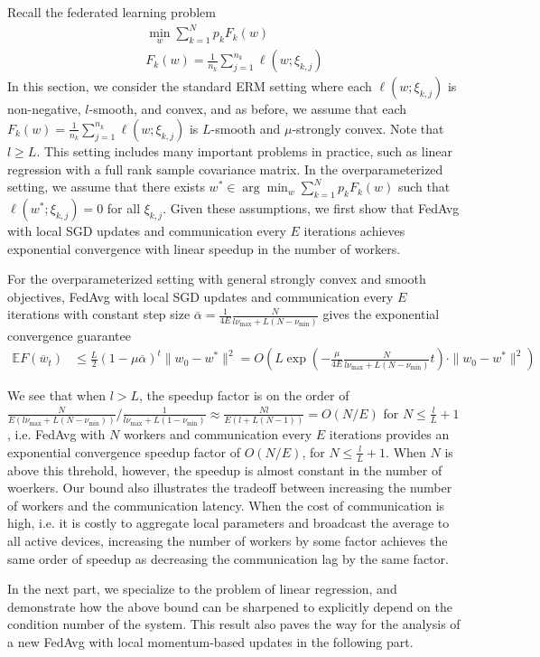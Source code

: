 Recall the federated learning problem 
\begin{align*}
\min_{w}\sum_{k=1}^{N}p_{k}F_{k}(w)\\
F_{k}(w)=\frac{1}{n_{k}}\sum_{j=1}^{n_{k}}\ell(w;\xi_{k,j})
\end{align*}
In this section, we consider the standard ERM setting where each
$\ell(w;\xi_{k,j})$ is non-negative, $l$-smooth, and convex, and
as before, we assume that each $F_{k}(w)=\frac{1}{n_{k}}\sum_{j=1}^{n_{k}}\ell(w;\xi_{k,j})$
is $L$-smooth and $\mu$-strongly convex. Note that $l\geq L$. This
setting includes many important problems in practice, such as linear
regression with a full rank sample covariance matrix. In the overparameterized
setting, we assume that there exists $w^{\ast}\in\arg\min_{w}\sum_{k=1}^{N}p_{k}F_{k}(w)$
such that $\ell(w^{\ast};\xi_{k,j})=0$ for all $\xi_{k,j}$. Given
these assumptions, we first show that FedAvg with local SGD updates
and communication every $E$ iterations achieves exponential convergence
with linear speedup in the number of workers.
\begin{theorem}
	For the overparameterized setting with general strongly convex and
	smooth objectives, FedAvg with local SGD updates and communication
	every $E$ iterations with constant step size $\overline{\alpha}=\frac{1}{4E}\frac{N}{l\nu_{\max}+L(N-\nu_{\min})}$
	gives the exponential convergence guarantee 
	\begin{align*}
	\mathbb{E}F(\overline{w}_{t}) & \leq\frac{L}{2}(1-\mu\overline{\alpha})^{t}\|w_{0}-w^{\ast}\|^{2}=O(L\exp(-\frac{\mu}{4E}\frac{N}{l\nu_{\max}+L(N-\nu_{\min})}t)\cdot\|w_{0}-w^{\ast}\|^{2})
	\end{align*}
\end{theorem}
%
\begin{remark}
	We see that when $l>L$, the speedup factor is on the order of $\frac{N}{E(l\nu_{\max}+L(N-\nu_{\min}))}/\frac{1}{l\nu_{\max}+L(1-\nu_{\min})}\approx\frac{Nl}{E(l+L(N-1))}=O(N/E)$
	for $N\leq\frac{l}{L}+1$, i.e. FedAvg with $N$ workers and communication
	every $E$ iterations provides an exponential convergence speedup
	factor of $O(N/E)$, for $N\leq\frac{l}{L}+1$. When $N$ is above
	this threhold, however, the speedup is almost constant in the number
	of woerkers. Our bound also illustrates the tradeoff between increasing
	the number of workers and the communication latency. When the cost
	of communication is high, i.e. it is costly to aggregate local parameters
	and broadcast the average to all active devices, increasing the number
	of workers by some factor achieves the same order of speedup as decreasing
	the communication lag by the same factor. 
\end{remark}
In the next part, we specialize to the problem of linear regression,
and demonstrate how the above bound can be sharpened to explicitly
depend on the condition number of the system. This result also paves
the way for the analysis of a new FedAvg with local momentum-based
updates in the following part. 

